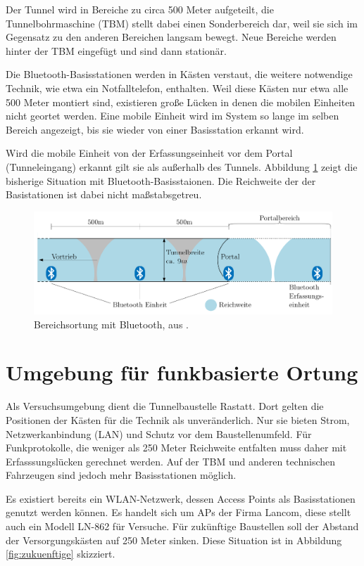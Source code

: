 Der Tunnel wird in Bereiche zu circa 500 Meter aufgeteilt, die Tunnelbohrmaschine (TBM) stellt dabei einen Sonderbereich dar, weil sie sich im Gegensatz zu den anderen Bereichen langsam bewegt. 
Neue Bereiche werden hinter der TBM eingefügt und sind dann stationär.

Die Bluetooth-Basisstationen werden in Kästen verstaut, die weitere notwendige Technik, wie etwa ein Notfalltelefon, enthalten.
Weil diese Kästen nur etwa alle 500 Meter montiert sind, existieren große Lücken in denen die mobilen Einheiten nicht geortet werden.
Eine mobile Einheit wird im System so lange im selben Bereich angezeigt, bis sie wieder von einer Basisstation erkannt wird.

Wird die mobile Einheit von der Erfassungseinheit vor dem Portal (Tunneleingang) erkannt gilt sie als außerhalb des Tunnels.
Abbildung \ref{fig:bisherige} zeigt die bisherige Situation mit Bluetooth-Basisstaionen. 
Die Reichweite der der Basistationen ist dabei nicht maßstabsgetreu.

\begin{figure}[h]
  \centering
	\includegraphics[width=\textwidth]{images/bisherige.png}
  \caption{Bereichsortung mit Bluetooth, aus \cite{maurer2016unterstuetzung}.}
  \label{fig:bisherige}
\end{figure}

 
\section{Umgebung für funkbasierte Ortung}
Als Versuchsumgebung dient die Tunnelbaustelle Rastatt.
Dort gelten die Positionen der Kästen für die Technik als unveränderlich.
Nur sie bieten Strom, Netzwerkanbindung (LAN) und Schutz vor dem Baustellenumfeld.
Für Funkprotokolle, die weniger als 250 Meter Reichweite entfalten muss daher mit Erfasssungslücken gerechnet werden.
Auf der TBM und anderen technischen Fahrzeugen sind jedoch mehr Basisstationen möglich.

Es existiert bereits ein WLAN-Netzwerk, dessen Access Points als Basisstationen genutzt werden können.
Es handelt sich um APs der Firma Lancom, diese stellt auch ein Modell LN-862 für Versuche.
Für zukünftige Baustellen soll der Abstand der Versorgungskästen auf 250 Meter sinken. 
Diese Situation ist in Abbildung \ref{fig:zukuenftige} skizziert.

